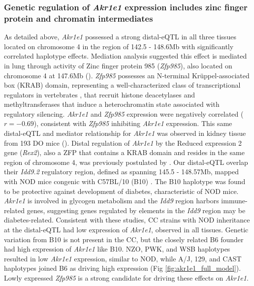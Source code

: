 \documentclass[10pt,letterpaper]{article}
\begin{document}
\subsubsection*{Genetic regulation of \textit{Akr1e1} expression includes zinc finger protein and chromatin intermediates}
As detailed above, \textit{Akr1e1} possessed a strong distal-eQTL in all three tissues located on chromosome 4 in the region of 142.5 - 148.6Mb with significantly correlated haplotype effects. Mediation analysis suggested this effect is mediated in lung through activity of Zinc finger protein 985 (\textit{Zfp985}), also located on chromosome 4 at 147.6Mb (). 
\textit{Zfp985} possesses an N-terminal Kr{\"u}ppel-associated box (KRAB) domain, representing a well-characterized class of transcriptional regulators in vertebrates \cite{Ecco2017}, that recruit histone deacetylases and methyltransferases that induce a heterochromatin state associated with regulatory silencing. 
\textit{Akr1e1} and \textit{Zfp985} expression were negatively correlated ($r = -0.69$), consistent with \textit{Zfp985} inhibiting \textit{Akr1e1} expression. This same distal-eQTL and mediator relationship for \textit{Akr1e1} was observed in kidney tissue from 193 DO mice ().
Distal regulation of \textit{Akr1e1} by the Reduced expression 2 gene (\textit{Rex2}), also a ZFP that contains a KRAB domain and resides in the same region of chromosome 4, was previously postulated by \cite{HamiltonWilliams2013}.
Our distal-eQTL overlap their \textit{Idd9.2} regulatory region, defined as spanning 145.5 - 148.57Mb, mapped with NOD mice congenic with C57BL/10 (B10) \cite{HamiltonWilliams2010}.
The B10 haplotype was found to be protective against development of diabetes, characteristic of NOD mice.
\textit{Akr1e1} is involved in glycogen metabolism and the \textit{Idd9} region harbors immune-related genes, suggesting genes regulated by elements in the \textit{Idd9} region may be diabetes-related. 
Consistent with these studies, CC strains with NOD inheritance at the distal-eQTL had low expression of \textit{Akr1e1}, observed in all tissues.
Genetic variation from B10 is not present in the CC, but the closely related B6 founder had high expression of \textit{Akr1e1} like B10.
NZO, PWK, and WSB haplotypes resulted in low \textit{Akr1e1} expression, similar to NOD, while A/J, 129, and CAST haplotypes joined B6 as driving high expression (Fig \ref{fig:akr1e1_full_model}). Lowly expressed \textit{Zfp985} is a strong candidate for driving these effects on \textit{Akr1e1}.
\end{document}
